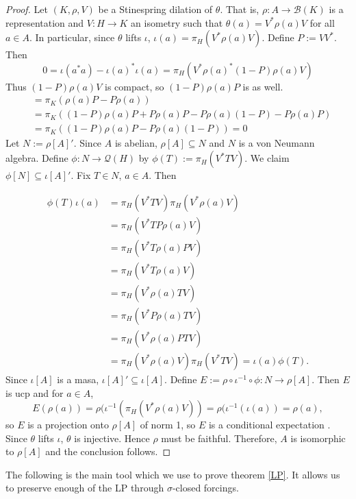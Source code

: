 \documentclass[10pt]{amsart}
\theoremstyle{definition}
\begin{document}
\begin{proof}
    Let $(K,\rho,V)$ be a Stinespring dilation of $\theta$. That is, $\rho:A\rightarrow\mathscr{B}(K)$ is a representation and $V:H\rightarrow K$ an isometry such that $\theta(a)=V^*\rho(a)V$ for all $a\in A$. In particular, since $\theta$ lifts $\iota$, $\iota(a)=\pi_H(V^*\rho(a)V)$. Define $P:=VV^*$.
    Then
    \[0=\iota(a^*a)-\iota(a)^*\iota(a)=\pi_H(V^*\rho(a)^*(1-P)\rho(a)V)\]
    Thus $(1-P)\rho(a)V$ is compact, so $(1-P)\rho(a)P$ is as well.
    \begin{align*}
        [\pi_K(\rho(a)),\pi_K(P)] &= \pi_K(\rho(a)P-P\rho(a)) \\
        &= \pi_K((1-P)\rho(a)P+P\rho(a)P-P\rho(a)(1-P)-P\rho(a)P) \\
        &=\pi_K((1-P)\rho(a)P-P\rho(a)(1-P))=0
    \end{align*}
Let $N:=\rho[A]'$. Since $A$ is abelian, $\rho[A]\subseteq N$ and $N$ is a von Neumann algebra. Define $\phi: N\rightarrow\mathscr{Q}(H)$ by $\phi(T):=\pi_H(V^*TV)$. We claim $\phi[N]\subseteq\iota[A]'$. Fix $T\in N$, $a\in A$. Then

\begin{align*}
    \phi(T)\iota(a) &= \pi_H(V^*TV)\pi_H(V^*\rho(a)V) \\
    &= \pi_H(V^*TP\rho(a)V) \\
    &= \pi_H(V^*T\rho(a)PV) \\
    &= \pi_H(V^*T\rho(a)V) \\
    &= \pi_H(V^*\rho(a)TV) \\
    &= \pi_H(V^*P\rho(a)TV) \\
    &= \pi_H(V^*\rho(a)PTV) \\
    &= \pi_H(V^*\rho(a)V)\pi_H(V^*TV) =\iota(a)\phi(T).
\end{align*}
Since $\iota[A]$ is a masa, $\iota[A]'\subseteq\iota[A]$. Define $E:=\rho\circ\iota^{-1}\circ\phi: N\rightarrow \rho[A]$. Then $E$ is ucp and for $a\in A$,
\[E(\rho(a))=\rho(\iota^{-1}(\pi_H(V^*\rho(a)V))=\rho(\iota^{-1}(\iota(a))=\rho(a),\]
so $E$ is a projection onto $\rho[A]$ of norm 1, so $E$ is a conditional expectation \cite[II.6.10.2]{BLA}. Since $\theta$ lifts $\iota$, $\theta$ is injective. Hence $\rho$ must be faithful. Therefore, $A$ is isomorphic to $\rho[A]$ and the conclusion follows.
\end{proof}

The following is the main tool which we use to prove theorem \ref{LP}. It allows us to preserve enough of the LP through $\sigma$-closed forcings.
\end{document}
